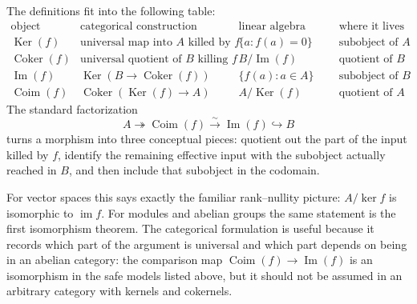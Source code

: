 The definitions fit into the following table:
\[
\begin{array}{c|c|c|c}
\text{object} & \text{categorical construction} & \text{linear algebra model} & \text{where it lives}\\
\hline
\operatorname{Ker}(f) & \text{universal map into }A\text{ killed by }f & \{a:f(a)=0\} & \text{subobject of }A\\
\operatorname{Coker}(f) & \text{universal quotient of }B\text{ killing }f & B/\operatorname{Im}(f) & \text{quotient of }B\\
\operatorname{Im}(f) & \operatorname{Ker}(B\to\operatorname{Coker}(f)) & \{f(a):a\in A\} & \text{subobject of }B\\
\operatorname{Coim}(f) & \operatorname{Coker}(\operatorname{Ker}(f)\to A) & A/\operatorname{Ker}(f) & \text{quotient of }A
\end{array}
\]
The standard factorization
\[
  A\twoheadrightarrow \operatorname{Coim}(f)
  \xrightarrow{\sim}
  \operatorname{Im}(f)\hookrightarrow B
\]
turns a morphism into three conceptual pieces: quotient out the part of the input killed by \(f\), identify the remaining effective input with the subobject actually reached in \(B\), and then include that subobject in the codomain.

For vector spaces this says exactly the familiar rank--nullity picture: \(A/\ker f\) is isomorphic to \(\operatorname{im}f\).  For modules and abelian groups the same statement is the first isomorphism theorem.  The categorical formulation is useful because it records which part of the argument is universal and which part depends on being in an abelian category: the comparison map \(\operatorname{Coim}(f)\to\operatorname{Im}(f)\) is an isomorphism in the safe models listed above, but it should not be assumed in an arbitrary category with kernels and cokernels.
